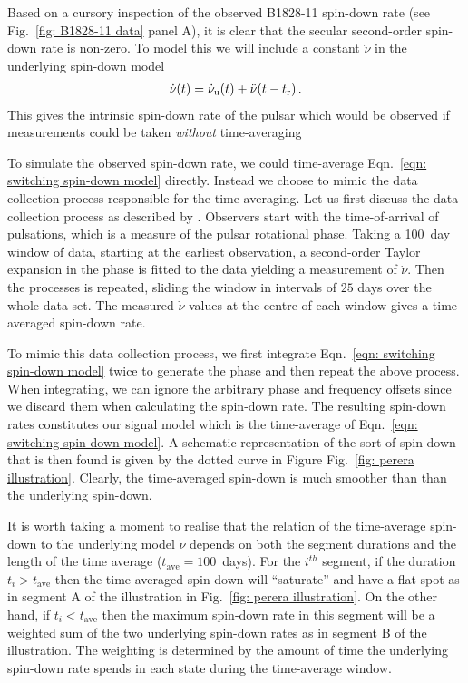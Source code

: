 \documentclass[../full_thesis/full_thesis.tex]{subfiles}
\newcommand{\tI}[1]{t_{\mathrm{#1}}}
\newcommand{\nudot}{\dot{\nu}}
\begin{document}
Based on a cursory inspection of the observed B1828-11 spin-down rate (see
Fig.~\ref{fig: B1828-11 data} panel A), it is clear that the secular
second-order spin-down rate is non-zero. To model this we will include a
constant $\ddot{\nu}$ in the underlying spin-down model
\begin{align}
    \nudot(t) = \dot{\nu}_{\mathrm{u}}(t) + \ddot{\nu}(t-\tref)\,.
\label{eqn: switching spin-down model}
\end{align}
This gives the intrinsic spin-down rate of the pulsar which would be observed if
measurements could be taken \emph{without} time-averaging

To simulate the observed spin-down rate, we could time-average Eqn.~\eqref{eqn:
switching spin-down model} directly. Instead we choose to mimic the data
collection process responsible for the time-averaging. Let
us first discuss the data collection process as described by \citet{Lyne2010}.
Observers start with the time-of-arrival of pulsations, which is a measure of
the pulsar rotational phase. Taking a 100~day window of data, starting at the
earliest observation, a second-order Taylor expansion in the phase is fitted to
the data yielding a measurement of $\dot{\nu}$. Then the processes is repeated,
sliding the window in intervals of $25$ days over the whole data set. The
measured $\dot{\nu}$ values at the centre of each window gives a time-averaged
spin-down rate.

To mimic this data collection process, we first integrate Eqn.~\eqref{eqn:
switching spin-down model} twice to generate the phase and then repeat the
above process.  When integrating, we can ignore the arbitrary phase and
frequency offsets since we discard them when calculating the spin-down rate.
The resulting spin-down rates constitutes our signal model which is the
time-average of Eqn.~\eqref{eqn: switching spin-down model}.  A schematic
representation of the sort of spin-down that is then found is given by the
dotted curve in Figure  Fig.~\ref{fig: perera illustration}.  Clearly, the
time-averaged spin-down is much smoother than than the underlying spin-down.


It is worth taking a moment to realise that the relation of the time-average
spin-down to the underlying model $\nudot$ depends on both the segment
durations and the length of the time average ($\tI{ave}=100$~days). For the
$i^{th}$ segment, if the duration $t_{i} > \tI{ave}$ then the time-averaged
spin-down will ``saturate'' and have a flat spot as in segment A of the
illustration in Fig.~\ref{fig: perera illustration}. On the other hand, if
$t_{i} < \tI{ave}$ then the maximum spin-down rate in this segment will be a
weighted sum of the two underlying spin-down rates as in segment B of the
illustration. The weighting is determined by the amount of time the underlying
spin-down rate spends in each state during the time-average window.
\end{document}
